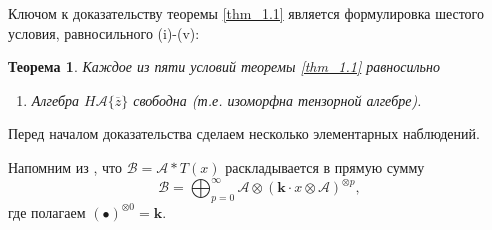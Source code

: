 \documentclass[10pt,a4paper]{article}
\def\A{\mathscr{A}}
\def\B{\mathscr{B}}
\def\k{\mathbf{k}}
\newtheorem{thm}{Теорема}[section]
\theoremstyle{definition}
\begin{document}
Ключом к доказательству теоремы \ref{thm_1.1} является формулировка шестого условия, равносильного (i)-(v):
\begin{thm}\label{thm_1.3} Каждое из пяти условий теоремы \ref{thm_1.1} равносильно
\begin{enumerate}
\item[(vi)] Алгебра $H\A\{\overline{z}\}$ свободна (т.е. изоморфна тензорной алгебре).
\end{enumerate}
\end{thm}
Перед началом доказательства сделаем несколько элементарных наблюдений.

Напомним из \cite{15}, что $\B=\A\ast T(x)$ раскладывается в прямую сумму
\begin{equation}\label{eq:1.4}\B=\bigoplus_{p=0}^\infty \A\otimes (\k\cdot x\otimes \A)^{\otimes p},
\end{equation}
 где полагаем $(\bullet)^{\otimes 0}=\k.$
\end{document}
